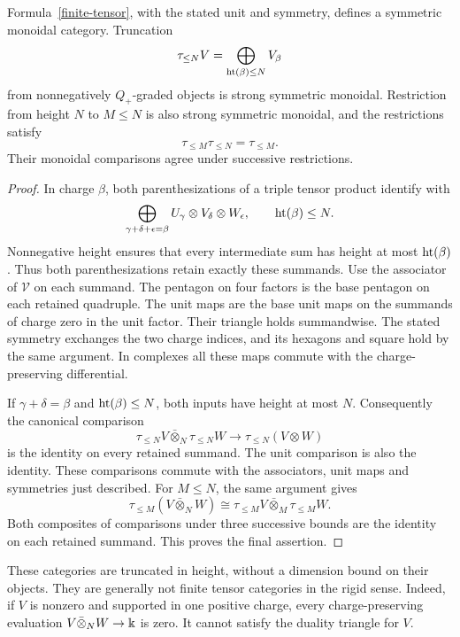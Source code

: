 \begin{proposition}\label{monoidal-restriction}
Formula~\eqref{finite-tensor}, with the stated unit and symmetry, defines
a symmetric monoidal category.  Truncation
\[
 \tau_{\leq N}V=\bigoplus_{\operatorname{ht}(\beta)\leq N}V_\beta
\]
from nonnegatively $Q_+$-graded objects is strong symmetric monoidal.
Restriction from height $N$ to $M\leq N$ is also strong symmetric
monoidal, and the restrictions satisfy
\begin{equation}
 \tau_{\leq M}\tau_{\leq N}=\tau_{\leq M}.\label{transition}
\end{equation}
Their monoidal comparisons agree under successive restrictions.
\end{proposition}

\begin{proof}
In charge $\beta$, both parenthesizations of a triple tensor product
identify with
\[
 \bigoplus_{\gamma+\delta+\epsilon=\beta}
 U_\gamma\otimes V_\delta\otimes W_\epsilon,
 \qquad \operatorname{ht}(\beta)\leq N.
\]
Nonnegative height ensures that every intermediate sum has height at
most $\operatorname{ht}(\beta)$.  Thus both parenthesizations retain exactly these
summands.  Use the associator of $\mathcal V$ on each summand.
The pentagon on four factors is the base pentagon on each retained
quadruple.  The unit maps are the base unit maps on the summands of
charge zero in the unit factor.  Their triangle holds summandwise.
The stated symmetry exchanges the two charge indices, and its hexagons
and square hold by the same argument.  In complexes all these maps
commute with the charge-preserving differential.

If $\gamma+\delta=\beta$ and $\operatorname{ht}(\beta)\leq N$, both inputs have
height at most $N$.  Consequently the canonical comparison
\[
 \tau_{\leq N}V\bar\otimes_N\tau_{\leq N}W
 \longrightarrow\tau_{\leq N}(V\otimes W)
\]
is the identity on every retained summand.  The unit comparison is also
the identity.  These comparisons commute with the associators, unit maps
and symmetries just described.  For $M\leq N$, the same argument gives
\[
 \tau_{\leq M}(V\bar\otimes_N W)
 \cong\tau_{\leq M}V\bar\otimes_M\tau_{\leq M}W.
\]
Both composites of comparisons under three successive bounds are the
identity on each retained summand.  This proves the final assertion.
\end{proof}

These categories are truncated in height, without a dimension bound on
their objects.  They are generally not finite tensor categories in the
rigid sense.  Indeed, if $V$ is nonzero and supported in one positive
charge, every charge-preserving evaluation $V\bar\otimes_N W\to\Bbbk$
is zero.  It cannot satisfy the duality triangle for $V$.

